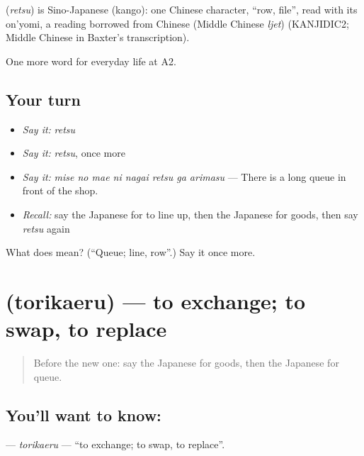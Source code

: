 \begin{cousinweb}
\textbf{} (\emph{retsu}) is Sino-Japanese (kango): one Chinese character, \textquotedblleft{}row, file\textquotedblright{}, read with its on'yomi, a reading borrowed from Chinese (Middle Chinese \emph{ljet}) (KANJIDIC2; Middle Chinese in Baxter's transcription).
\end{cousinweb}

\begin{grammarlens}[title={What you've built}]
One more word for everyday life at A2.
\end{grammarlens}

\subsection*{Your turn}
\begin{itemize}
\raggedright
  \item \emph{Say it:} \emph{retsu}
  \item \emph{Say it:} \emph{retsu}, once more
  \item \emph{Say it:} \emph{mise no mae ni nagai retsu ga arimasu} — There is a long queue in front of the shop.
  \item \emph{Recall:} say the Japanese for to line up, then the Japanese for goods, then say \emph{retsu} again
\end{itemize}

\begin{tcolorbox}[breakable,colback=teal!4,colframe=teal!35!black,title={Before you move on}]
What does  mean? (\textquotedblleft{}Queue; line, row\textquotedblright{}.) Say it once more.
\end{tcolorbox}
\section[\texorpdfstring{\ja{とりかえる} (torikaeru)}{とりかえる (torikaeru)}]{ (torikaeru) — to exchange; to swap, to replace}

\label{lesson:JA-C184-torikaeru}



\begin{quote}
Before the new one: say the Japanese for goods, then the Japanese for queue.
\end{quote}

\subsection*{You'll want to know: }
\textbf{} — \emph{torikaeru} — \textquotedblleft{}to exchange; to swap, to replace\textquotedblright{}.


